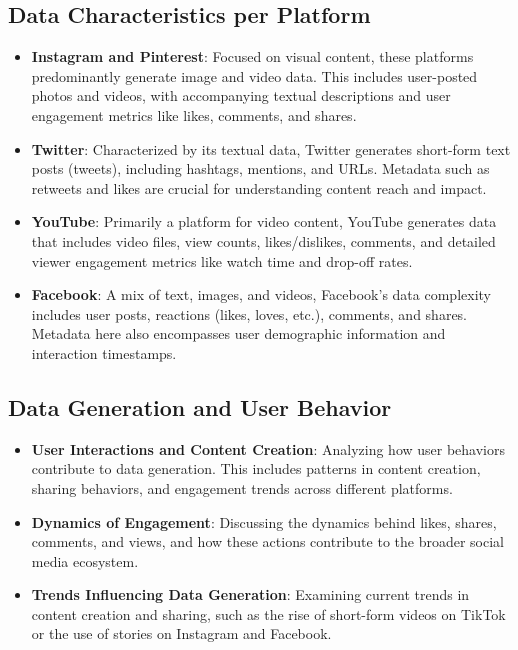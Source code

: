 \documentclass[
]{book}
\providecommand{\tightlist}{%
  \setlength{\itemsep}{0pt}\setlength{\parskip}{0pt}}
\begin{document}
\hypertarget{data-characteristics-per-platform}{%
\subsection*{Data Characteristics per Platform}\label{data-characteristics-per-platform}}

\begin{itemize}
\tightlist
\item
  \textbf{Instagram and Pinterest}: Focused on visual content, these platforms predominantly generate image and video data. This includes user-posted photos and videos, with accompanying textual descriptions and user engagement metrics like likes, comments, and shares.
\item
  \textbf{Twitter}: Characterized by its textual data, Twitter generates short-form text posts (tweets), including hashtags, mentions, and URLs. Metadata such as retweets and likes are crucial for understanding content reach and impact.
\item
  \textbf{YouTube}: Primarily a platform for video content, YouTube generates data that includes video files, view counts, likes/dislikes, comments, and detailed viewer engagement metrics like watch time and drop-off rates.
\item
  \textbf{Facebook}: A mix of text, images, and videos, Facebook's data complexity includes user posts, reactions (likes, loves, etc.), comments, and shares. Metadata here also encompasses user demographic information and interaction timestamps.
\end{itemize}

\hypertarget{data-generation-and-user-behavior}{%
\subsection*{Data Generation and User Behavior}\label{data-generation-and-user-behavior}}

\begin{itemize}
\tightlist
\item
  \textbf{User Interactions and Content Creation}: Analyzing how user behaviors contribute to data generation. This includes patterns in content creation, sharing behaviors, and engagement trends across different platforms.
\item
  \textbf{Dynamics of Engagement}: Discussing the dynamics behind likes, shares, comments, and views, and how these actions contribute to the broader social media ecosystem.
\item
  \textbf{Trends Influencing Data Generation}: Examining current trends in content creation and sharing, such as the rise of short-form videos on TikTok or the use of stories on Instagram and Facebook.
\end{itemize}
\end{document}
